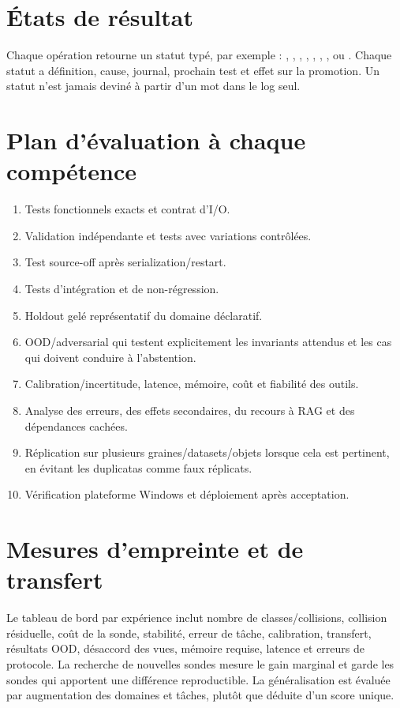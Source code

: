 \documentclass[11pt,a4paper]{report}
\begin{document}
\section{États de résultat}
Chaque opération retourne un statut typé, par exemple : , , , , , , ,  ou . Chaque statut a définition, cause, journal, prochain test et effet sur la promotion. Un statut n'est jamais deviné à partir d'un mot dans le log seul.

\section{Plan d'évaluation à chaque compétence}
\begin{enumerate}[leftmargin=1.6em]
\item Tests fonctionnels exacts et contrat d'I/O.
\item Validation indépendante et tests avec variations contrôlées.
\item Test source-off après serialization/restart.
\item Tests d'intégration et de non-régression.
\item Holdout gelé représentatif du domaine déclaratif.
\item OOD/adversarial qui testent explicitement les invariants attendus et les cas qui doivent conduire à l'abstention.
\item Calibration/incertitude, latence, mémoire, coût et fiabilité des outils.
\item Analyse des erreurs, des effets secondaires, du recours à RAG et des dépendances cachées.
\item Réplication sur plusieurs graines/datasets/objets lorsque cela est pertinent, en évitant les duplicatas comme faux réplicats.
\item Vérification plateforme Windows et déploiement après acceptation.
\end{enumerate}

\section{Mesures d'empreinte et de transfert}
Le tableau de bord par expérience inclut nombre de classes/collisions, collision résiduelle, coût de la sonde, stabilité, erreur de tâche, calibration, transfert, résultats OOD, désaccord des vues, mémoire requise, latence et erreurs de protocole. La recherche de nouvelles sondes mesure le gain marginal et garde les sondes qui apportent une différence reproductible. La généralisation est évaluée par augmentation des domaines et tâches, plutôt que déduite d'un score unique.
\end{document}
